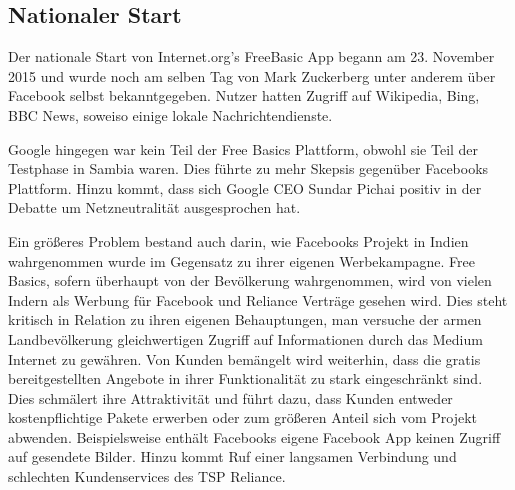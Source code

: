 \documentclass{article}
\begin{document}
\subsection{Nationaler Start}
Der nationale Start von Internet.org's FreeBasic App begann am 23. November 2015 und wurde noch am selben Tag von Mark Zuckerberg unter anderem über Facebook selbst bekanntgegeben. Nutzer hatten Zugriff auf Wikipedia, Bing, BBC News, soweiso einige lokale Nachrichtendienste.
	
Google hingegen war kein Teil der Free Basics Plattform, obwohl sie Teil der Testphase in Sambia waren. Dies führte zu mehr Skepsis gegenüber Facebooks Plattform. Hinzu kommt, dass sich Google CEO Sundar Pichai positiv in der Debatte um Netzneutralität ausgesprochen hat.
	
Ein größeres Problem bestand auch darin, wie Facebooks Projekt in Indien wahrgenommen wurde im Gegensatz zu ihrer eigenen Werbekampagne.
Free Basics, sofern überhaupt von der Bevölkerung wahrgenommen, wird von vielen Indern als Werbung für Facebook und Reliance Verträge gesehen wird. Dies steht kritisch in Relation zu ihren eigenen Behauptungen, man versuche der armen Landbevölkerung gleichwertigen Zugriff auf Informationen durch das Medium Internet zu gewähren.
Von Kunden bemängelt wird weiterhin, dass die gratis bereitgestellten Angebote in ihrer Funktionalität zu stark eingeschränkt sind. Dies schmälert ihre Attraktivität und führt dazu, dass Kunden entweder kostenpflichtige Pakete erwerben oder zum größeren Anteil sich vom Projekt abwenden.
Beispielsweise enthält Facebooks eigene Facebook App keinen Zugriff auf gesendete Bilder. Hinzu kommt Ruf einer langsamen Verbindung und schlechten Kundenservices des TSP Reliance.
\end{document}
